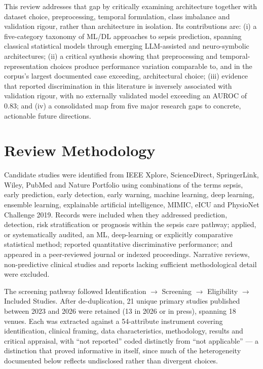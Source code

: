 \documentclass[conference]{IEEEtran}
\begin{document}
This review addresses that gap by critically examining architecture together with dataset choice, preprocessing, temporal formulation, class imbalance and validation rigour, rather than architecture in isolation. Its contributions are: (i) a five-category taxonomy of ML/DL approaches to sepsis prediction, spanning classical statistical models through emerging LLM-assisted and neuro-symbolic architectures; (ii) a critical synthesis showing that preprocessing and temporal-representation choices produce performance variation comparable to, and in the corpus's largest documented case exceeding, architectural choice; (iii) evidence that reported discrimination in this literature is inversely associated with validation rigour, with no externally validated model exceeding an AUROC of 0.83; and (iv) a consolidated map from five major research gaps to concrete, actionable future directions.

\section{Review Methodology}

Candidate studies were identified from IEEE Xplore, ScienceDirect, SpringerLink, Wiley, PubMed and Nature Portfolio using combinations of the terms sepsis, early prediction, early detection, early warning, machine learning, deep learning, ensemble learning, explainable artificial intelligence, MIMIC, eICU and PhysioNet Challenge 2019. Records were included when they addressed prediction, detection, risk stratification or prognosis within the sepsis care pathway; applied, or systematically audited, an ML, deep-learning or explicitly comparative statistical method; reported quantitative discriminative performance; and appeared in a peer-reviewed journal or indexed proceedings. Narrative reviews, non-predictive clinical studies and reports lacking sufficient methodological detail were excluded.

The screening pathway followed Identification $\rightarrow$ Screening $\rightarrow$ Eligibility $\rightarrow$ Included Studies. After de-duplication, 21 unique primary studies published between 2023 and 2026 were retained (13 in 2026 or in press), spanning 18 venues. Each was extracted against a 54-attribute instrument covering identification, clinical framing, data characteristics, methodology, results and critical appraisal, with ``not reported'' coded distinctly from ``not applicable'' --- a distinction that proved informative in itself, since much of the heterogeneity documented below reflects undisclosed rather than divergent choices.
\end{document}
